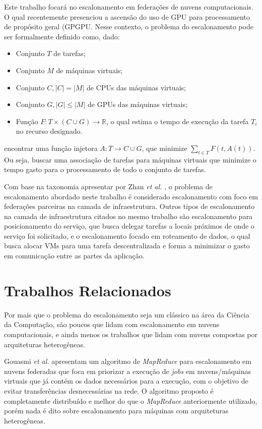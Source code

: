 Este trabalho focará no escalonamento em federações de nuvens computacionais. O qual recentemente presenciou a ascensão do uso de \acrfull{GPU} para processamento de propósito geral (\acrfull{GPGPU}\cite{Dimitrov:2009:USA:1513895.1513907}\cite{Yang:2010:GCM:1809028.1806606}. Nesse contexto, o problema do escalonamento pode ser formalmente definido como, dado:

\begin{itemize}
	\item Conjunto $T$ de tarefas;
	\item Conjunto $M$ de máquinas virtuais;
	\item Conjunto $C, |C| = |M|$ de CPUs das máquinas virtuais;
	\item Conjunto $G,  |G| \le |M|$ de GPUs das máquinas virtuais;
	\item Função $F: T \times (C \cup G) \to \mathbb{R}$, o qual estima o tempo de execução da tarefa $T_{i}$ no recurso designado.
\end{itemize}
encontrar uma função injetora $A: T \to C \cup G$, que minimize $\sum_{t \in T} F(t, A(t) )$. Ou seja, buscar uma associação de tarefas para máquinas virtuais que minimize o tempo gasto para o processamento de todo o conjunto de tarefas.

Com base na taxonomia apresentar por Zhan \textit{et al.} \cite{Zhan:2015:CCR:2775083.2788397}, o problema de escalonamento abordado neste trabalho é considerado escalonamento com foco em federações parceiras na camada de infraestrutura. Outros tipos de escalonamento na camada de infraestrutura citados no mesmo trabalho são escalonamento para posicionamento do serviço, que busca delegar tarefas a locais próximos de onde o serviço foi solicitado, e o escalonamento focado em roteamento de dados, o qual busca alocar \acrshort{VM}s para uma tarefa descentralizada e forma a minimizar o gasto em comunicação entre as partes da aplicação.

\section{Trabalhos Relacionados}

Por mais que o problema do escalonamento seja um clássico na área da Ciência da Computação, são poucos que lidam com escalonamento em nuvens computacionais, e ainda menos os trabalhos que lidam com nuvens compostas por arquiteturas heterogêneas. 

Gouasmi \textit{et al.} \cite{MapReduce_sched_8034997} apresentam um algoritmo de \textit{MapReduce}\cite{Dean:2008:MSD:1327452.1327492} para escalonamento em nuvens federadas que foca em priorizar a execução de \textit{jobs} em nuvens/máquinas virtuais que já contém os dados necessários para a execução, com o objetivo de evitar transferências desnecessárias na rede. O algoritmo proposto é completamente distribuído e melhor do que o \textit{MapReduce} anteriormente utilizado, porém nada é dito sobre escalonamento para máquinas com arquiteturas heterogêneas.

